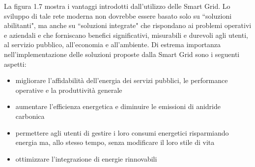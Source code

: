 \begin{figure}[h]
\end{figure}

La figura 1.7 mostra i vantaggi introdotti dall'utilizzo delle Smart Grid. Lo sviluppo di tale rete moderna non dovrebbe essere basato solo su ``soluzioni abilitanti", ma anche su ``soluzioni integrate" che rispondano ai problemi operativi e aziendali e che forniscano benefici significativi, misurabili e durevoli agli utenti, al servizio pubblico, all'economia e all'ambiente.
\newline 
Di estrema importanza nell'implementazione delle soluzioni proposte dalla Smart Grid sono i seguenti aspetti:
\begin{itemize}
\item migliorare l'affidabilità dell'energia dei servizi pubblici, le performance operative e la produttività generale
\item aumentare l'efficienza energetica e diminuire le emissioni di anidride carbonica
\item permettere agli utenti di gestire i loro consumi energetici risparmiando energia ma, allo stesso tempo, senza modificare il loro stile di vita
\item ottimizzare l'integrazione di energie rinnovabili 
\end{itemize}

